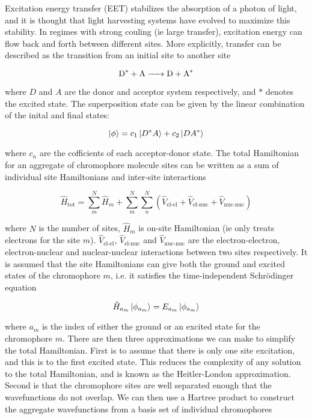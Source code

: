 Excitation energy transfer (EET) stabilizes the absorption of a photon of light,
and it is thought that light harvesting systems have evolved to maximize this stability\cite{Cleary2013}.
In regimes with strong couling (ie large transfer), excitation energy can flow back
and forth between different sites. More explicitly, transfer can be described as
the transition from an initial site to another site

\begin{equation}
\ce{D^* + A -> D + A^*}
\end{equation}

where $D$ and $A$ are the donor and acceptor system respectively, and $*$ denotes
the excited state. The superposition state can be given by the linear combination 
of the inital and final states:

\begin{equation}
\ket{\phi} = c_1 \ket{D^*A} + c_2 \ket{DA^*}
\end{equation}

where $c_n$ are the cofficients of each acceptor-donor state. The total Hamiltonian
for an aggregate of chromophore molecule sites can be written as a sum of individual 
site Hamiltonians and inter-site interactions

\begin{equation}
\hat{H}_{\text{tot}} = \sum^N_m \hat{H}_m + \sum^N_m \sum^N_n \left(\hat{V}_{\text{el-el}} + \hat{V}_{\text{el-nuc}} + \hat{V}_{\text{nuc-nuc}}\right)
\end{equation}

where $N$ is the number of sites, $\hat{H}_m$ is on-site Hamiltonian (ie only treats
electrons for the site $m$). $\hat{V}_{\text{el-el}}$, $\hat{V}_{\text{el-nuc}}$ 
and $\hat{V}_{\text{nuc-nuc}}$ are the electron-electron, electron-nuclear and nuclear-nuclear
interactions between two sites respectively. It is assumed that the site Hamiltonians
can give both the ground and excited states of the chromophore $m$, i.e. it satisfies
the time-independent Schrödinger equation

\begin{equation}
\hat{H}_{a_m} \ket{\phi_{a_m}} = E_{a_m} \ket{\phi_{a_m}}
\end{equation}

where ${a_m}$ is the index of either the ground or an excited state for the chromophore
$m$. There are then three approximations we can make to simplify the total Hamiltonian.
First is to assume that there is only one site excitation, and this is to the first
excited state. This reduces the complexity of any solution to the total Hamiltonian,
and is known as the Heitler-London approximation\cite{Agranovich2000}. Second is 
that the chromophore sites are well separated enough that the wavefunctions do not
overlap\cite{Frenkel1931}. We can then use a Hartree product to construct the aggregate
wavefunctions from a basis set of individual chromophores

